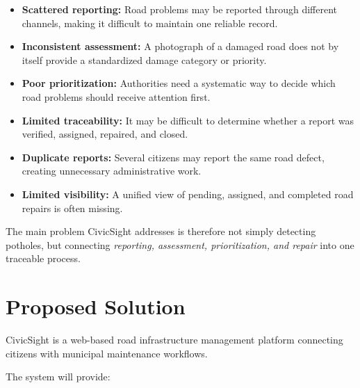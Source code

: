 \documentclass[11pt,a4paper]{article}
\begin{document}
\begin{itemize}[leftmargin=0.6cm]

    \item \textbf{Scattered reporting:} Road problems may be reported through different channels, making it difficult to maintain one reliable record.

    \item \textbf{Inconsistent assessment:} A photograph of a damaged road does not by itself provide a standardized damage category or priority.

    \item \textbf{Poor prioritization:} Authorities need a systematic way to decide which road problems should receive attention first.

    \item \textbf{Limited traceability:} It may be difficult to determine whether a report was verified, assigned, repaired, and closed.

    \item \textbf{Duplicate reports:} Several citizens may report the same road defect, creating unnecessary administrative work.

    \item \textbf{Limited visibility:} A unified view of pending, assigned, and completed road repairs is often missing.

\end{itemize}

The main problem CivicSight addresses is therefore not simply detecting potholes, but connecting \emph{reporting, assessment, prioritization, and repair} into one traceable process.

\section{Proposed Solution}

CivicSight is a web-based road infrastructure management platform connecting citizens with municipal maintenance workflows.

The system will provide:
\end{document}
